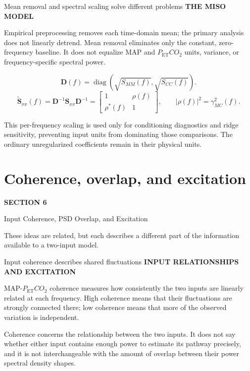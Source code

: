 \documentclass[aspectratio=169,11pt]{beamer}
\newcommand{\PETCOtwo}{P_{\mathrm{ET}}CO_2}
\newcommand{\sectionlabel}[1]{%
  {\color{Accent}\fontsize{8}{9.5}\selectfont\bfseries\MakeUppercase{#1}}\par\vspace{0.12cm}}
\newcommand{\sectionframe}[3]{%
  \begin{frame}[plain]
    \vspace{0.7cm}
    {\color{Accent}\fontsize{10}{12}\selectfont\bfseries SECTION #1}\par\vspace{0.45cm}
    {\color{Ink}\fontsize{24.5}{28}\selectfont #2}\par\vspace{0.55cm}
    {\color{Body}\fontsize{14.5}{19}\selectfont #3}
  \end{frame}}
\begin{document}
\begin{frame}{Mean removal and spectral scaling solve different problems}
\sectionlabel{The MISO Model}
Empirical preprocessing removes each time-domain mean; the primary analysis does
not linearly detrend. Mean removal eliminates only the constant, zero-frequency
baseline. It does not equalize MAP and $\PETCOtwo$ units, variance, or
frequency-specific spectral power.

\vspace{0.22cm}
\[
\mathbf D(f)=
\operatorname{diag}\!\left(\sqrt{S_{MM}(f)},\sqrt{S_{CC}(f)}\right).
\]
\vspace{-0.16cm}
\[
\widetilde{\mathbf S}_{xx}(f)=
\mathbf D^{-1}\mathbf S_{xx}\mathbf D^{-1}=
\begin{bmatrix}1&\rho(f)\\\rho^*(f)&1\end{bmatrix},
\qquad |\rho(f)|^2=\gamma^2_{MC}(f).
\]

This per-frequency scaling is used only for conditioning diagnostics and ridge
sensitivity, preventing input units from dominating those comparisons. The
ordinary unregularized coefficients remain in their physical units.
\end{frame}


\section{Coherence, overlap, and excitation}
\sectionframe{6}{Input Coherence, PSD Overlap, and Excitation}{%
These ideas are related, but each describes a different part of the information
available to a two-input model.}

\begin{frame}{Input coherence describes shared fluctuations}
\sectionlabel{Input Relationships and Excitation}
MAP-$\PETCOtwo$ coherence measures how consistently the two inputs are linearly
related at each frequency. High coherence means that their fluctuations are
strongly connected there; low coherence means that more of the observed
variation is independent.

\vspace{0.45cm}
Coherence concerns the relationship between the two inputs. It does not say
whether either input contains enough power to estimate its pathway precisely,
and it is not interchangeable with the amount of overlap between their power
spectral density shapes.
\end{frame}
\end{document}
